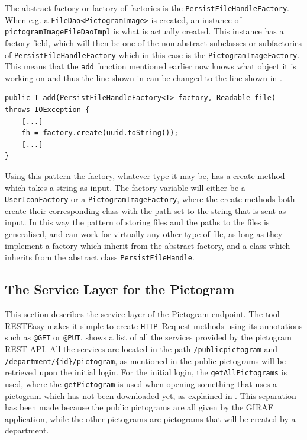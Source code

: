 The abstract factory or factory of factories is the \texttt{PersistFileHandleFactory}.
When e.g. a \texttt{FileDao<PictogramImage>} is created, an instance of \texttt{pictogramImageFileDaoImpl} is what is actually created.
This instance has a factory field, which will then be one of the non abstract subclasses or subfactories of \texttt{PersistFileHandleFactory} which in this case is the \texttt{PictogramImageFactory}.
This means that the \texttt{add} function mentioned earlier now knows what object it is working on and thus the line shown in  can be changed to the line shown in .

\begin{lstlisting}[float, floatplacement=h, caption={Trying to use a Type Parameter constructor, which Java cannot do. \texttt{[...]} denotes omitted code.},label={lst:TypeParameterConstructorActual}]
public T add(PersistFileHandleFactory<T> factory, Readable file) throws IOException {
    [...]
    fh = factory.create(uuid.toString());
    [...]
}
\end{lstlisting}

Using this pattern the factory, whatever type it may be, has a create method which takes a string as input.
The factory variable will either be a \texttt{UserIconFactory} or a \texttt{PictogramImageFactory}, where the create methods both create their corresponding class with the path set to the string that is sent as input.
In this way the pattern of storing files and the paths to the files is generalised, and can work for virtually any other type of file, as long as they implement a factory which inherit from the abstract factory, and a class which inherits from the abstract class \texttt{PersistFileHandle}.

\subsection{The Service Layer for the Pictogram}\label{ssec:pictogram_service}
This section describes the service layer of the Pictogram endpoint.
The tool RESTEasy makes it simple to create \texttt{HTTP}--Request methods using its annotations such as \texttt{@GET} or \texttt{@PUT}.
 shows a list of all the services provided by the pictogram REST API.
All the services are located in the path \texttt{/publicpictogram} and \texttt{/department/\{id\}/pictogram}, as mentioned in  the public pictograms will be retrieved upon the initial login.
For the initial login, the \texttt{getAllPictograms} is used, where the \texttt{getPictogram} is used when opening something that uses a pictogram which has not been downloaded yet, as explained in .
This separation has been made because the public pictograms are all given by the GIRAF application, while the other pictograms are pictograms that will be created by a department.

